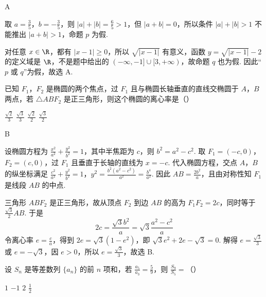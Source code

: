 \begin{answer}
A
\end{answer}

\begin{solution}
取 \(a=\frac35\)，\(b=-\frac35\)，则 \(|a|+|b|=\frac65>1\)，但 \(|a+b|=0\)，所以条件 \(|a|+|b|>1\) 不能推出 \(|a+b|>1\)，命题 \(p\) 为假.

对任意 \(x\in\R\)，都有 \(|x-1|\geq0\)，所以 \(\sqrt{|x-1|}\) 有意义，函数 \(y=\sqrt{|x-1|}-2\) 的定义域是 \(\R\)，不是题中给出的 \((-\infty,-1]\cup[3,+\infty)\)，故命题 \(q\) 也为假. 因此“\(p\) 或 \(q\)”为假，故选 A.
\end{solution}

\begin{problem}
已知 \(F_{1}\)，\(F_{2}\) 是椭圆的两个焦点，过 \(F_{1}\) 且与椭圆长轴垂直的直线交椭圆于 \(A\)，\(B\) 两点，若 \(\triangle ABF_{2}\) 是正三角形，则这个椭圆的离心率是（\quad）

\choices
    {\(\frac{\sqrt{2}}{3}\)}
    {\(\frac{\sqrt{3}}{3}\)}
    {\(\frac{\sqrt{2}}{2}\)}
    {\(\frac{\sqrt{3}}{2}\)}
\end{problem}

\begin{answer}
B
\end{answer}

\begin{solution}
设椭圆方程为 \(\frac{x^2}{a^2}+\frac{y^2}{b^2}=1\)，其中半焦距为 \(c\)，则 \(b^2=a^2-c^2\). 取 \(F_1=(-c,0)\)，\(F_2=(c,0)\)，过 \(F_1\) 且垂直于长轴的直线为 \(x=-c\). 代入椭圆方程，交点 \(A\)，\(B\) 的纵坐标满足
\(\frac{c^2}{a^2}+\frac{y^2}{b^2}=1\)，\(y^2=\frac{b^2(a^2-c^2)}{a^2}=\frac{b^4}{a^2}\).
因此 \(AB=\frac{2b^2}{a}\)，且由对称性知 \(F_1\) 是线段 \(AB\) 的中点.

三角形 \(ABF_2\) 是正三角形，故从顶点 \(F_2\) 到边 \(AB\) 的高为 \(F_1F_2=2c\)，同时等于 \(\frac{\sqrt3}{2}AB\). 于是
\[
2c=\frac{\sqrt3 b^2}{a}=\sqrt3\frac{a^2-c^2}{a}
\]
令离心率 \(e=\frac ca\)，得到 \(2e=\sqrt3(1-e^2)\)，即
\(\sqrt3e^2+2e-\sqrt3=0\). 解得 \(e=\frac{\sqrt3}{3}\) 或 \(e=-\sqrt3\)，因 \(e>0\)，所以 \(e=\frac{\sqrt3}{3}\)，故选 B.
\end{solution}

\begin{problem}
设 \(S_{n}\) 是等差数列 \(\{a_{n}\}\) 的前 \(n\) 项和，若 \(\frac{a_{5}}{a_{3}} = \frac{5}{9}\)，则 \(\frac{S_{9}}{S_{5}} =\)（\quad）

\choices
    {\(1\)}
    {\(-1\)}
    {\(2\)}
    {\(\frac{1}{2}\)}
\end{problem}

